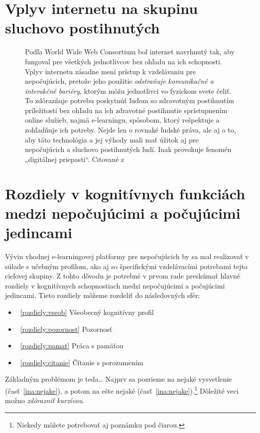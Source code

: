\documentclass[10pt,twoside,slovak,a4paper]{article}
\begin{document}
\section{Vplyv internetu na skupinu sluchovo postihnutých} \label{vplyvinternetu}

\begin{figure}[tbh]
Podľa World Wide Web Consortium bol internet navrhnutý tak, aby fungoval pre všetkých jednotlivcov bez ohľadu na ich schopnosti. Vplyv internetu zásadne mení prístup k vzdelávaniu pre nepočujúcich, pretože jeho použitie \emph{odstraňuje komunikačné a interakčné bariéry}, ktorým môžu jednotlivci vo fyzickom svete čeliť. To zdôrazňuje potrebu poskytnúť ľuďom so zdravotným postihnutím príležitosti bez ohľadu na ich zdravotné postihnutie sprístupnením online služieb, najmä e-learningu, spôsobom, ktorý rešpektuje a zohľadňuje ich potreby. Nejde len o rovnaké ľudské práva, ale aj o to, aby táto technológia a jej výhody mali mať úžitok aj pre nepočujúcich a sluchovo postihnutých ľudí. Inak provokuje fenomén „digitálnej priepasti“.\linebreak
Citované z \cite{pappas2018learning}
\end{figure}



\section{Rozdiely v kognitívnych funkciách medzi nepočujúcimi a počujúcimi jedincami} \label{rozdiely}
Vývin vhodnej e-learningovej platformy pre nepočujúcich by sa mal realizovať v súlade s učebným profilom, ako aj so špecifickými vzdelávacími potrebami  tejto cieľovej skupiny. Z tohto dôvodu je potrebné v prvom rade preskúmať hlavné rozdiely v kognitívnych schopnostiach medzi nepočujúcimi a počujúcimi jedincami.\linebreak
Tieto rozdiely môžeme rozdeliť do následovných sfér:
\begin{itemize}
\item ~\ref{rozdiely:vseob} Všeobecný kognitívny profil
\item ~\ref{rozdiely:pozornost} Pozornosť
\item ~\ref{rozdiely:pamat} Práca s pamäťou
\item ~\ref{rozdiely:citanie} Čítanie s porozumením
\end{itemize}
Základným problémom je teda\ldots{} Najprv sa pozrieme na nejaké vysvetlenie (časť~\ref{ina:nejake}), a potom na ešte nejaké (časť~\ref{ina:nejake}).\footnote{Niekedy môžete potrebovať aj poznámku pod čiarou.}
Dôležité veci možno \emph{zdôrazniť kurzívou}.
\end{document}
